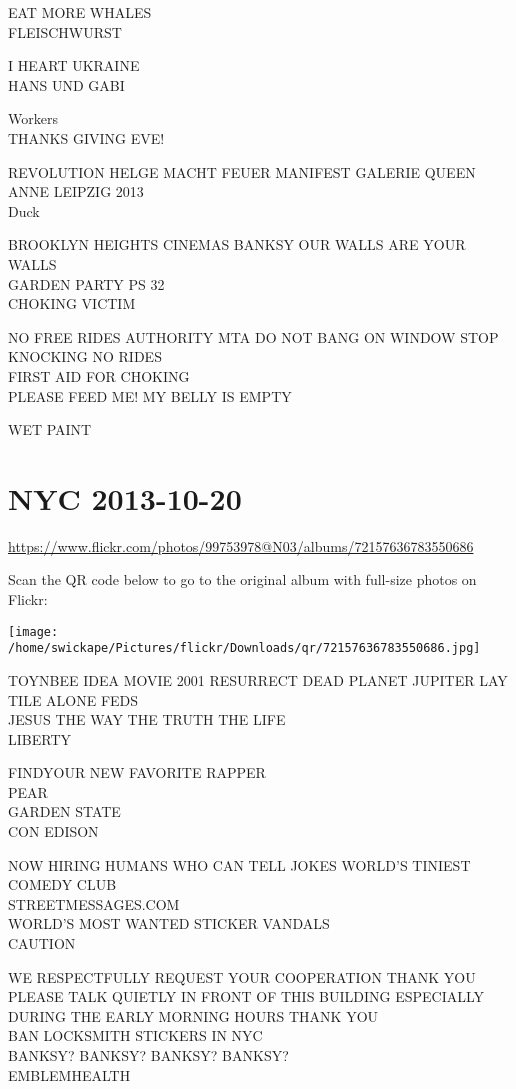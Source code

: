 \documentclass[10pt,letterpaper]{article}
\begin{document}
EAT MORE WHALES\\
FLEISCHWURST

I HEART UKRAINE\\
HANS UND GABI

Workers\\
THANKS GIVING EVE!

REVOLUTION HELGE MACHT FEUER MANIFEST GALERIE QUEEN ANNE LEIPZIG 2013\\
Duck

BROOKLYN HEIGHTS CINEMAS BANKSY OUR WALLS ARE YOUR WALLS\\
GARDEN PARTY PS 32\\
CHOKING VICTIM

NO FREE RIDES AUTHORITY MTA DO NOT BANG ON WINDOW STOP KNOCKING NO RIDES\\
FIRST AID FOR CHOKING\\
PLEASE FEED ME! MY BELLY IS EMPTY

WET PAINT
\pagebreak

\section*{NYC 2013-10-20}

\url{https://www.flickr.com/photos/99753978@N03/albums/72157636783550686}

Scan the QR code below to go to the original album with full-size photos on Flickr:

\texttt{[image: /home/swickape/Pictures/flickr/Downloads/qr/72157636783550686.jpg]}
\pagebreak

TOYNBEE IDEA MOVIE 2001 RESURRECT DEAD PLANET JUPITER LAY TILE ALONE FEDS\\
JESUS THE WAY THE TRUTH THE LIFE\\
LIBERTY

FINDYOUR NEW FAVORITE RAPPER\\
PEAR\\
GARDEN STATE\\
CON EDISON

NOW HIRING HUMANS WHO CAN TELL JOKES WORLD'S TINIEST COMEDY CLUB\\
STREETMESSAGES.COM\\
WORLD'S MOST WANTED STICKER VANDALS\\
CAUTION

WE RESPECTFULLY REQUEST YOUR COOPERATION THANK YOU PLEASE TALK QUIETLY IN FRONT OF THIS BUILDING ESPECIALLY DURING THE EARLY MORNING HOURS THANK YOU\\
BAN LOCKSMITH STICKERS IN NYC\\
BANKSY? BANKSY? BANKSY? BANKSY?\\
EMBLEMHEALTH
\end{document}
